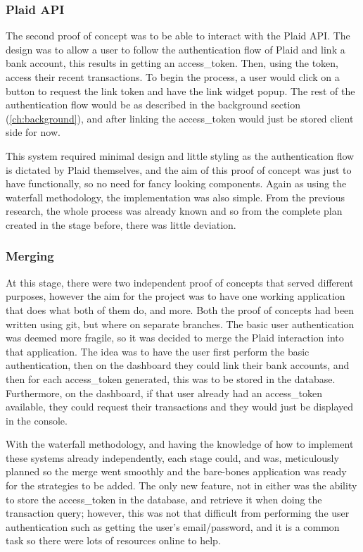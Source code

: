 \subsubsection{Plaid API}
The second proof of concept was to be able to interact with the Plaid API. The design was to allow a user to follow the authentication flow of Plaid and link a bank account, this results in getting an access\_token. Then, using the token, access their recent transactions. To begin the process, a user would click on a button to request the link token and have the link widget popup. The rest of the authentication flow would be as described in the background section (\ref{ch:background}), and after linking the access\_token would just be stored client side for now.

This system required minimal design and little styling as the authentication flow is dictated by Plaid themselves, and the aim of this proof of concept was just to have functionally, so no need for fancy looking components. Again as using the waterfall methodology, the implementation was also simple. From the previous research, the whole process was already known and so from the complete plan created in the stage before, there was little deviation.

\subsubsection{Merging}
At this stage, there were two independent proof of concepts that served different purposes, however the aim for the project was to have one working application that does what both of them do, and more. Both the proof of concepts had been written using git, but where on separate branches. The basic user authentication was deemed more fragile, so it was decided to merge the Plaid interaction into that application. The idea was to have the user first perform the basic authentication, then on the dashboard they could link their bank accounts, and then for each access\_token generated, this was to be stored in the database. Furthermore, on the dashboard, if that user already had an access\_token available, they could request their transactions and they would just be displayed in the console.

With the waterfall methodology, and having the knowledge of how to implement these systems already independently, each stage could, and was, meticulously planned so the merge went smoothly and the bare-bones application was ready for the strategies to be added. The only new feature, not in either was the ability to store the access\_token in the database, and retrieve it when doing the transaction query; however, this was not that difficult from performing the user authentication such as getting the user's email/password, and it is a common task so there were lots of resources online to help.

